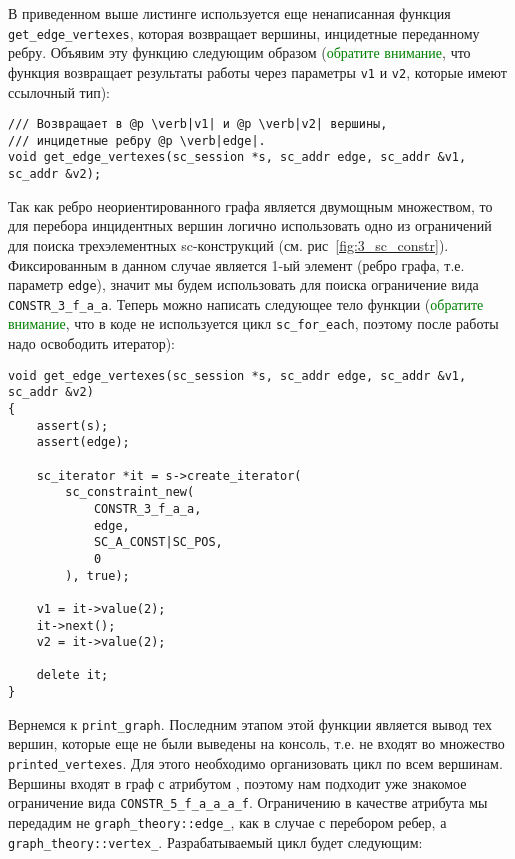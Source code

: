 В приведенном выше листинге используется еще ненаписанная функция
\lstinline|get_edge_vertexes|, которая возвращает вершины, инцидетные
переданному ребру. Объявим эту функцию следующим образом
(\textcolor{green}{обратите внимание}, что функция возвращает результаты
работы через параметры \lstinline|v1| и \lstinline|v2|, которые имеют
ссылочный тип):

\begin{lstlisting}[texcl]
/// Возвращает в @p \verb|v1| и @p \verb|v2| вершины,
/// инцидетные ребру @p \verb|edge|.
void get_edge_vertexes(sc_session *s, sc_addr edge, sc_addr &v1, sc_addr &v2);
\end{lstlisting}

Так как ребро неориентированного графа является двумощным множеством,
то для перебора инцидентных вершин логично использовать одно из
ограничений для поиска трехэлементных sc-конструкций
(см. рис~\ref{fig:3_sc_constr}). Фиксированным в данном случае
является 1-ый элемент (ребро графа, т.е. параметр \lstinline|edge|),
значит мы будем использовать для поиска ограничение вида
\lstinline|CONSTR_3_f_a_a|. Теперь можно написать следующее тело
функции (\textcolor{green}{обратите внимание}, что в коде не
используется цикл \lstinline|sc_for_each|, поэтому после работы надо
освободить итератор):

\begin{lstlisting}[texcl]
void get_edge_vertexes(sc_session *s, sc_addr edge, sc_addr &v1, sc_addr &v2)
{
    assert(s);
    assert(edge);

    sc_iterator *it = s->create_iterator(
        sc_constraint_new(
            CONSTR_3_f_a_a,
            edge,
            SC_A_CONST|SC_POS,
            0
        ), true);

    v1 = it->value(2);
    it->next();
    v2 = it->value(2);

    delete it;
}
\end{lstlisting}

Вернемся к \lstinline|print_graph|. Последним этапом этой функции
является вывод тех вершин, которые еще не были выведены на консоль,
т.е. не входят во множество \lstinline|printed_vertexes|. Для этого
необходимо организовать цикл по всем вершинам.  Вершины входят в граф
с атрибутом , поэтому нам подходит уже знакомое
ограничение вида \lstinline|CONSTR_5_f_a_a_a_f|. Ограничению в
качестве атрибута мы передадим не \lstinline|graph_theory::edge_|, как
в случае с перебором ребер, а
\lstinline|graph_theory::vertex_|. Разрабатываемый цикл будет
следующим:

